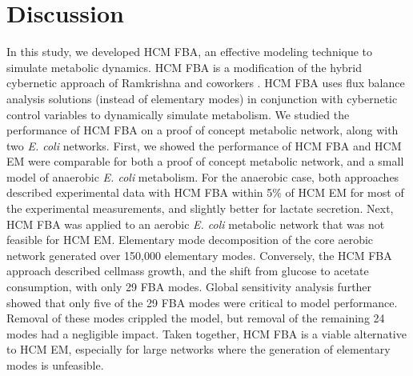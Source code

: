 \documentclass[10pt,twocolumn,twoside,final]{IEEEtran}
\begin{document}
\section{Discussion}
In this study, we developed HCM FBA, an effective modeling technique to simulate metabolic dynamics.
HCM FBA is a modification of the hybrid cybernetic approach of Ramkrishna and coworkers \cite{2008_kim_varner_ramkrishna_BiotechProg}.
HCM FBA uses flux balance analysis solutions (instead of elementary modes) in conjunction with cybernetic control variables to dynamically simulate metabolism.
We studied the performance of HCM FBA on a proof of concept metabolic network, along with two \emph{E. coli} networks.
First, we showed the performance of HCM FBA and HCM EM were comparable for both a proof of concept metabolic network, and a small model of anaerobic \textit{E. coli} metabolism.
For the anaerobic case, both approaches described experimental data with HCM FBA within 5\% of HCM EM for most of the experimental measurements, and slightly better for lactate secretion.
Next, HCM FBA was applied to an aerobic \textit{E. coli} metabolic network that was not feasible for HCM EM.
Elementary mode decomposition of the core aerobic network generated over 150,000 elementary modes.
Conversely, the HCM FBA approach described cellmass growth, and the shift from glucose to acetate consumption, with only 29 FBA modes.
Global sensitivity analysis further showed that only five of the 29 FBA modes were critical to model performance.
Removal of these modes crippled the model, but removal of the remaining 24 modes had a negligible impact.
Taken together, HCM FBA is a viable alternative to HCM EM, especially for large networks where the generation of elementary modes is unfeasible.
\end{document}
